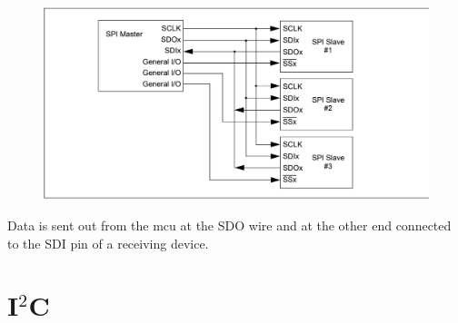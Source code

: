 \begin{figure}[H]
	\centering
    \includegraphics[width=.8\linewidth]{Figures/PIC_SPI}
	\label{fig:PIC_SPI}
\end{figure}
Data is sent out from the \gls{mcu} at the SDO wire and at the other end connected to the SDI pin of a receiving device. 


\section{I$^2$C}


